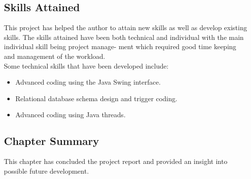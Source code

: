 \documentclass[12pt,a4paper]{article}
\begin{document}
	\subsection{Skills Attained}
	This project has helped the author to attain new skills as well as develop existing skills. The skills
attained have been both technical and individual with the main individual skill being project manage-
ment which required good time keeping and management of the workload. \\
Some technical skills that
have been developed include:
	\begin{itemize}
		\item Advanced coding using the Java Swing interface.
		\item Relational database schema design and trigger coding.
		\item Advanced coding using Java threads.
	\end{itemize}
\subsection{Chapter Summary}	
This chapter has concluded the project report and provided an insight into possible future development.
	

\newpage


\end{document}
